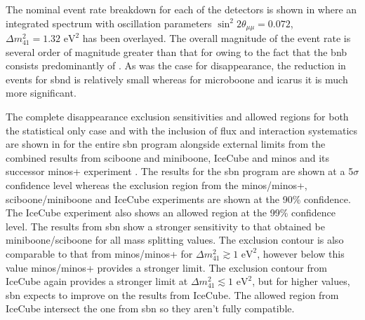 The nominal event rate breakdown for each of the detectors is shown in  where an integrated spectrum with oscillation parameters $\sin^2{2\theta_{\mu \mu}} = 0.072$, $\Delta m^2_{41} = 1.32 \text{ eV}^2$ has been overlayed. The overall magnitude of the event rate is several order of magnitude greater than that for \nue owing to the fact that the \gls{bnb} consists predominantly of \numu. As was the case for \nue disappearance, the reduction in events for \gls{sbnd} is relatively small whereas for \gls{microboone} and \gls{icarus} it is much more significant.

The complete \numu disappearance exclusion sensitivities and allowed regions for both the statistical only case and with the inclusion of flux and interaction systematics are shown in  for the entire \gls{sbn} program alongside external limits from the combined results from \gls{sciboone} and \gls{miniboone}, IceCube and \gls{minos} and its successor \gls{minos}+ experiment \cite{MiniBooNE/SciBooNE_numu_disapp_contour} \cite{IceCube_numu_disapp_contour}\cite{MINOS}\cite{MINOS+}. The results for the \gls{sbn} program are shown at a 5$\sigma$ confidence level whereas the exclusion region from the \gls{minos}/\gls{minos}+, \gls{sciboone}/\gls{miniboone} and IceCube experiments are shown at the 90\% confidence. The IceCube experiment also shows an allowed region at the 99\% confidence level. The results from \gls{sbn} show a stronger sensitivity to that obtained be \gls{miniboone}/\gls{sciboone} for all mass splitting values. The exclusion contour is also comparable to that from \gls{minos}/\gls{minos}+ for $\Delta m^2_{41} \gtrsim 1\text{ eV}^2$, however below this value \gls{minos}/\gls{minos}+ provides a stronger limit. The exclusion contour from IceCube again provides a stronger limit at $\Delta m^2_{41} \lesssim 1\text{ eV}^2$, but for higher values, \gls{sbn} expects to improve on the results from IceCube. The allowed region from IceCube intersect the one from \gls{sbn} so they aren't fully compatible. 

